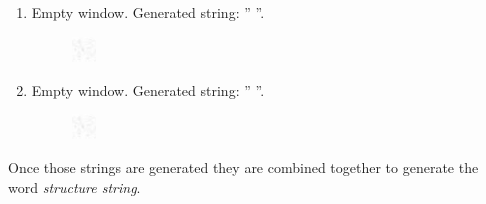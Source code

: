 \begin{enumerate}[label=(\alph*)]
\begin{figure}[!ht]
\end{figure} 
\item Empty window. Generated string: ''\emph{ }''.
\begin{figure}[!ht]
\centering
\includegraphics[width=0.06\textwidth]{images/missouri/11.png}
\end{figure} 
\item Empty window. Generated string: ''\emph{ }''.
\begin{figure}[!ht]
\centering
\includegraphics[width=0.06\textwidth]{images/missouri/12.png}
\end{figure} 
\end{enumerate}

Once those strings are generated they are combined together to generate the word \textit{structure string}. 


